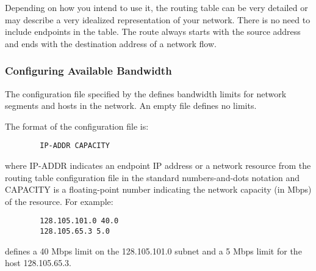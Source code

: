 Depending on how you intend to use it, the routing table can be very
detailed or may describe a very idealized representation of your
network.
There is no need to include endpoints in the table.
The route always starts with the source address and ends with the
destination address of a network flow.

\subsubsection{\label{sec:Bandwidth-Alloc-Capinfo}
Configuring Available Bandwidth}

The configuration file specified by the 
 defines bandwidth limits for network
segments and hosts in the network.
An empty file defines no limits.

The format of the configuration file is:
\begin{verbatim}
        IP-ADDR CAPACITY
\end{verbatim}
where IP-ADDR indicates an endpoint IP address or a network resource
from the routing table configuration file in the standard
numbers-and-dots notation and CAPACITY is a floating-point number
indicating the network capacity (in Mbps) of the resource.
For example:
\begin{verbatim}
        128.105.101.0 40.0
        128.105.65.3 5.0
\end{verbatim}
defines a 40 Mbps limit on the 128.105.101.0 subnet and a 5 Mbps limit
for the host 128.105.65.3.
